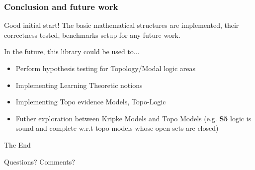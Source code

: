 \documentclass[
	11pt, %
	aspectratio=1610, %
]{beamer}
\begin{document}

\begin{frame}
	\frametitle{Conclusion and future work}

	Good initial start! The basic mathematical structures are implemented, their
	correctness tested, benchmarks setup for any future work.

	In the future, this library could be used to...

	\begin{itemize}
		\item Perform hypothesis testing for Topology/Modal logic areas
		\item Implementing Learning Theoretic notions
		\item Implementing Topo evidence Models, Topo-Logic
		\item Futher exploration between Kripke Models and Topo Models (e.g. \textbf{S5} 
		logic is sound and complete w.r.t topo models whose open sets are closed)
	\end{itemize}
\end{frame}


\begin{frame}[plain] %
	\begin{center}
		{\Huge The End}

		\bigskip\bigskip %

		{\LARGE Questions? Comments?}
	\end{center}
\end{frame}

\end{document}
